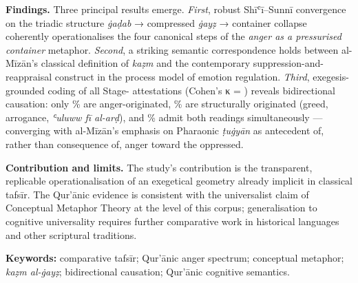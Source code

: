 \documentclass[12pt,a4paper]{article}
\newenvironment{englishabstract}
  {%
    \clearpage
    \begin{LTR}%
    \DefaultMathsDigits
    \englishbody
    \setstretch{1.25}%
    \setlength{\parindent}{0pt}%
    \setlength{\parskip}{0.6em plus 0.2em}%
  }%
  {\end{LTR}}
\begin{document}
\begin{englishabstract}
\noindent\textbf{Findings.} Three principal results emerge. \textit{First}, robust Shīʿī–Sunnī convergence on the triadic structure \textit{ġaḍab} → compressed \textit{ġayẓ} → container collapse coherently operationalises the four canonical steps of the \textit{anger as a pressurised container} metaphor. \textit{Second}, a striking semantic correspondence holds between al-Mīzān’s classical definition of \textit{kaẓm} and the contemporary suppression-and-reappraisal construct in the process model of emotion regulation. \textit{Third}, exegesis-grounded coding of all  Stage- attestations (Cohen’s κ = ) reveals bidirectional causation: only \% are anger-originated, \% are structurally originated (greed, arrogance, \textit{ʿuluww fī al-arḍ}), and \% admit both readings simultaneously — converging with al-Mīzān’s emphasis on Pharaonic \textit{ṭuġyān} as antecedent of, rather than consequence of, anger toward the oppressed.

\noindent\textbf{Contribution and limits.} The study’s contribution is the transparent, replicable operationalisation of an exegetical geometry already implicit in classical tafsīr. The Qur’ānic evidence is consistent with the universalist claim of Conceptual Metaphor Theory at the level of this corpus; generalisation to cognitive universality requires further comparative work in historical languages and other scriptural traditions.

\vspace{4pt}

\noindent\textbf{Keywords:} comparative tafsīr; Qur’ānic anger spectrum; conceptual metaphor; \textit{kaẓm al-ġayẓ}; bidirectional causation; Qur’ānic cognitive semantics.

\end{englishabstract}
\end{document}
